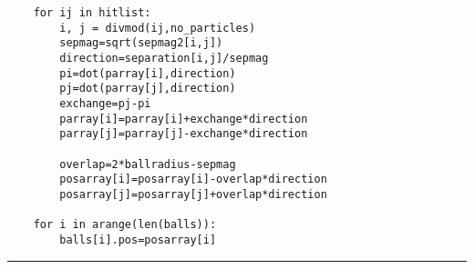 \documentclass[a4]{article}
\begin{document}
{\begin{verbatim}
    for ij in hitlist: 
        i, j = divmod(ij,no_particles) 
        sepmag=sqrt(sepmag2[i,j]) 
        direction=separation[i,j]/sepmag 
        pi=dot(parray[i],direction) 
        pj=dot(parray[j],direction) 
        exchange=pj-pi 
        parray[i]=parray[i]+exchange*direction 
        parray[j]=parray[j]-exchange*direction 

        overlap=2*ballradius-sepmag 
        posarray[i]=posarray[i]-overlap*direction 
        posarray[j]=posarray[j]+overlap*direction

    for i in arange(len(balls)): 
        balls[i].pos=posarray[i] 

\end{verbatim}\hrule}

\end{document}
